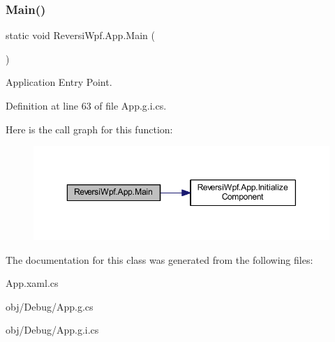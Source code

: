 \subsubsection{\texorpdfstring{Main()}{Main()}\hspace{0.1cm}{\footnotesize\ttfamily [4/4]}}
{\footnotesize\ttfamily static void Reversi\+Wpf.\+App.\+Main (\begin{DoxyParamCaption}{ }\end{DoxyParamCaption})\hspace{0.3cm}{\ttfamily [static]}}



Application Entry Point. 



Definition at line 63 of file App.\+g.\+i.\+cs.

Here is the call graph for this function\+:
\nopagebreak
\begin{figure}[H]
\begin{center}
\leavevmode
\includegraphics[width=350pt]{class_reversi_wpf_1_1_app_a21f38c0f40a47a04302edeeb7bf005f8_cgraph}
\end{center}
\end{figure}


The documentation for this class was generated from the following files\+:\begin{DoxyCompactItemize}
\item 
App.\+xaml.\+cs\item 
obj/\+Debug/App.\+g.\+cs\item 
obj/\+Debug/App.\+g.\+i.\+cs\end{DoxyCompactItemize}
